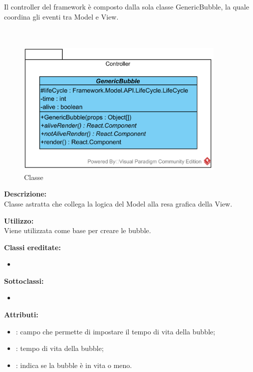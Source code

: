 \subsubsection[::Controller]{\class}\label{\class}
Il controller del framework è composto dalla sola classe GenericBubble, la quale coordina gli eventi tra Model e View.

\paragraph[::GenericBubble]{\class}\mbox{}\\ \label{\class}
\begin{figure}[H]
	\centering
	\includegraphics[width=10cm]{./diagrammi/framework/controller/genericbubble.png}
	\caption{Classe \class}
\end{figure}
\textbf{Descrizione:}\\
Classe astratta che collega la logica del Model alla resa grafica della View.

\textbf{Utilizzo:}\\
Viene utilizzata come base per creare le bubble.

\textbf{Classi ereditate:}
\begin{itemize}
	\item {}
\end{itemize}

\textbf{Sottoclassi:}
\begin{itemize}
	\item 
\end{itemize}

\textbf{Attributi:}
\begin{itemize}
	\item {}: campo che permette di impostare il tempo di vita della bubble;
	\item {}: tempo di vita della bubble;
	\item {}: indica se la bubble è in vita o meno.
\end{itemize}

